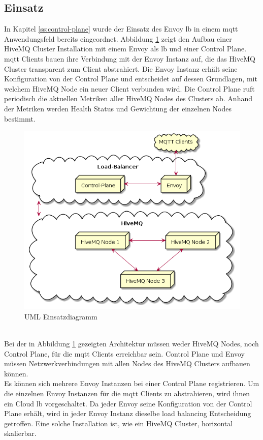 \subsection{Einsatz}
In Kapitel \ref{ss:control-plane} wurde der Einsatz des Envoy \acl{lb} in einem \ac{mqtt} Anwendungsfeld bereits eingeordnet. Abbildung \ref{fig:deployment-diagram} zeigt den Aufbau einer HiveMQ Cluster Installation mit einem Envoy als \ac{lb} und einer Control Plane.
\\
\ac{mqtt} Clients bauen ihre Verbindung mit der Envoy Instanz auf, die das HiveMQ Cluster transparent zum Client abstrahiert. Die Envoy Instanz erhält seine Konfiguration von der Control Plane und entscheidet auf dessen Grundlagen, mit welchem HiveMQ Node ein neuer Client verbunden wird. Die Control Plane ruft periodisch die aktuellen Metriken aller HiveMQ Nodes des Clusters ab. Anhand der Metriken werden Health Status und Gewichtung der einzelnen Nodes bestimmt.
\begin{figure}
    \centering
    \includegraphics[scale=0.6]{gen/deployment.png}
    \caption{UML Einsatzdiagramm}
    \label{fig:deployment-diagram}
\end{figure}
\\
Bei der in Abbildung \ref{fig:deployment-diagram} gezeigten Architektur müssen weder HiveMQ Nodes, noch Control Plane, für die \ac{mqtt} Clients erreichbar sein. Control Plane und Envoy müssen Netzwerkverbindungen mit allen Nodes des HiveMQ Clusters aufbauen können.
\\
Es können sich mehrere Envoy Instanzen bei einer Control Plane registrieren.
Um die einzelnen Envoy Instanzen für die \ac{mqtt} Clients zu abstrahieren, wird ihnen ein Cloud \acl{lb} vorgeschaltet.
Da jeder Envoy seine Konfiguration von der Control Plane erhält, wird in jeder Envoy Instanz dieselbe load balancing Entscheidung getroffen.
Eine solche Installation ist, wie ein HiveMQ Cluster, horizontal skalierbar.
\newpage
